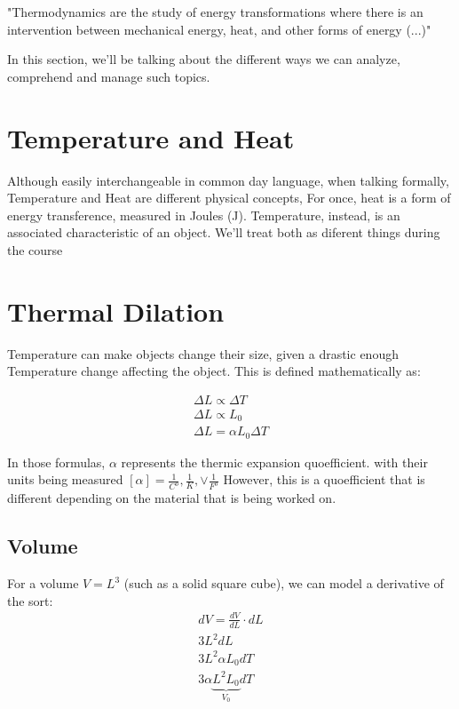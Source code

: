 \documentclass[11pt,fleqn]{book} %
\begin{document}
"Thermodynamics are the study of energy transformations 
where there is an intervention between mechanical energy, 
heat, and other forms of energy (...)" \cite{1}

In this section, we'll be talking about the different ways we can analyze, comprehend and manage such topics.

\section{Temperature and Heat}
Although easily interchangeable in common day language, when talking formally, Temperature and Heat
are different physical concepts, For once, heat is a form of energy transference, measured in Joules (J). 
Temperature, instead, is an associated characteristic of an object. We'll treat both as diferent things during the course

\section{Thermal Dilation}
Temperature can make objects change their size, given a drastic enough Temperature change affecting the object.
This is defined mathematically as:

\begin{gather}
    \Delta L \propto \Delta T\\
    \Delta L \propto L_0\\
    \Delta L = \alpha L_0 \Delta T
\end{gather}

In those formulas, $\alpha$ represents the thermic expansion quoefficient. with 
their units being measured $[\alpha] = \frac{1}{C^o}, \frac{1}{K}, \lor \frac{1}{F^o}$
However, this is a quoefficient that is different depending on the material that is being worked on.

\subsection{Volume}

For a volume $V = L^3$ (such as a solid square cube), we can model a derivative of the sort:
\begin{gather}
    dV = \frac{dV}{dL}\cdot dL\\
    3L^2 dL\\
    3L^2 \alpha L_0 dT \\
    3 \alpha \underbrace{L^2 L_0}_{V_0} dT
\end{gather}
\end{document}
